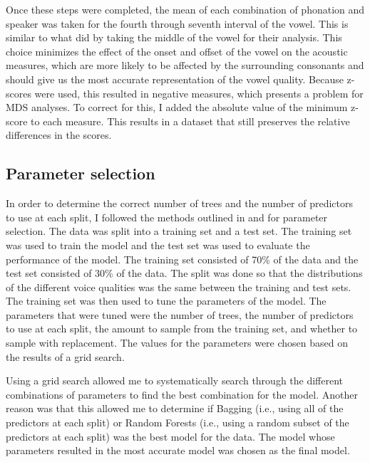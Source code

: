 Once these steps were completed, the mean of each combination of phonation and speaker was taken for the fourth through seventh interval of the vowel. This is similar to what \citet{keatingCrosslanguageAcousticSpace2023} did by taking the middle of the vowel for their analysis. This choice minimizes the effect of the onset and offset of the vowel on the acoustic measures, which are more likely to be affected by the surrounding consonants and should give us the most accurate representation of the vowel quality. Because z-scores were used, this resulted in negative measures, which presents a problem for MDS analyses. To correct for this, I added the absolute value of the minimum z-score to each measure. This results in a dataset that still preserves the relative differences in the scores. 
\subsection{Parameter selection} \label{sec:bagging_model}

In order to determine the correct number of trees and the number of predictors to use at each split, I followed the methods outlined in \citet{boehmkeHandsOnMachineLearning2019} and \citet{jamesIntroductionStatisticalLearning2021} for parameter selection. The data was split into a training set and a test set. The training set was used to train the model and the test set was used to evaluate the performance of the model. The training set consisted of 70\% of the data and the test set consisted of 30\% of the data. The split was done so that the distributions of the different voice qualities was the same between the training and test sets. The training set was then used to tune the parameters of the model. The parameters that were tuned were the number of trees, the number of predictors to use at each split, the amount to sample from the training set, and whether to sample with replacement. The values for the parameters were chosen based on the results of a grid search.

Using a grid search allowed me to systematically search through the different combinations of parameters to find the best combination for the model. Another reason was that this allowed me to determine if Bagging (i.e., using all of the predictors at each split) or Random Forests (i.e., using a random subset of the predictors at each split) was the best model for the data. The model whose parameters resulted in the most accurate model was chosen as the final model. 

